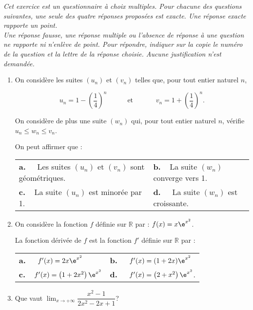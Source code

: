 
\medskip

\emph{Cet exercice est un questionnaire à choix multiples. Pour chacune des questions suivantes, une seule des quatre réponses proposées est exacte. Une réponse exacte rapporte un point. \\
Une réponse fausse, une réponse multiple ou l’absence de réponse à une question ne rapporte ni n’enlève de point. Pour répondre, indiquer sur la copie le numéro de la question et la lettre de la réponse choisie. Aucune justification n’est demandée.}

\medskip

\begin{enumerate}
\item On considère les suites $\left(u_n\right)$ et $\left(v_n\right)$ telles que, pour tout entier naturel $n$,

\[u_n= 1-\left(\frac{1}{4}\right)^n \hspace{3em} \text{et }\hspace{3em} v_n=1+\left(\frac{1}{4}\right)^n.\]

On considère de plus une suite $\left(w_n\right)$ qui, pour tout entier naturel $n$, vérifie $u_n\leqslant w_n\leqslant v_n$.

On peut affirmer que :

\begin{tabularx}{\linewidth}{*{2}{X}}
\textbf{a.~~} Les suites $\left(u_n\right)$ et $\left(v_n\right)$ sont géométriques. &\textbf{b.~~}La suite $(w_n)$ converge vers 1. \\
\textbf{c.~~}La suite $\left(u_n\right)$ est minorée par 1.& \textbf{d.~~} La suite $\left(w_n\right)$ est croissante. 
\end{tabularx}

\item On considère la fonction $f$ définie sur $\mathbb{R}$ par : $f(x)= x\e^{x^2}$.

La fonction dérivée de $f$ est la fonction $f'$ définie sur $\mathbb{R}$ par :

\begin{tabularx}{\linewidth}{*{2}{X}}
\textbf{a.~~} $ f'(x) = 2x\e^{x^2}$&\textbf{b.~~} $ f'(x) = (1+2x) \e^{x^2}$\\
\textbf{c.~~}$ f'(x) = \left(1+2x^2\right) \e^{x^2}$ &\textbf{d.~~} $ f'(x) = \left(2+x^2\right) \e^{x^2} $.  
\end{tabularx}
\item Que vaut $\displaystyle \lim_{x\to +\infty} \dfrac{x^2-1}{2x^2-2x+1}$?


\end{enumerate}
